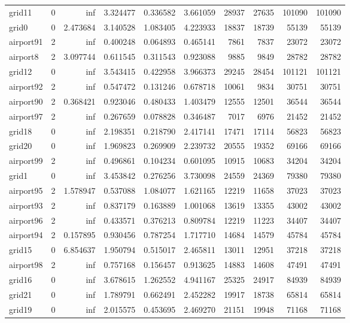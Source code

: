 \begin{longtable}{|l|r|r|r|r|r|r|r|r|r|}
grid11 & 0 & inf & 3.324477 & 0.336582 & 3.661059 & 28937 & 27635 & 101090 & 101090 \\
grid0 & 0 & 2.473684 & 3.140528 & 1.083405 & 4.223933 & 18837 & 18739 & 55139 & 55139 \\
airport91 & 2 & inf & 0.400248 & 0.064893 & 0.465141 & 7861 & 7837 & 23072 & 23072 \\
airport8 & 2 & 3.097744 & 0.611545 & 0.311543 & 0.923088 & 9885 & 9849 & 28782 & 28782 \\
grid12 & 0 & inf & 3.543415 & 0.422958 & 3.966373 & 29245 & 28454 & 101121 & 101121 \\
airport92 & 2 & inf & 0.547472 & 0.131246 & 0.678718 & 10061 & 9834 & 30751 & 30751 \\
airport90 & 2 & 0.368421 & 0.923046 & 0.480433 & 1.403479 & 12555 & 12501 & 36544 & 36544 \\
airport97 & 2 & inf & 0.267659 & 0.078828 & 0.346487 & 7017 & 6976 & 21452 & 21452 \\
grid18 & 0 & inf & 2.198351 & 0.218790 & 2.417141 & 17471 & 17114 & 56823 & 56823 \\
grid20 & 0 & inf & 1.969823 & 0.269909 & 2.239732 & 20555 & 19352 & 69166 & 69166 \\
airport99 & 2 & inf & 0.496861 & 0.104234 & 0.601095 & 10915 & 10683 & 34204 & 34204 \\
grid1 & 0 & inf & 3.453842 & 0.276256 & 3.730098 & 24559 & 24369 & 79380 & 79380 \\
airport95 & 2 & 1.578947 & 0.537088 & 1.084077 & 1.621165 & 12219 & 11658 & 37023 & 37023 \\
airport93 & 2 & inf & 0.837179 & 0.163889 & 1.001068 & 13619 & 13355 & 43002 & 43002 \\
airport96 & 2 & inf & 0.433571 & 0.376213 & 0.809784 & 12219 & 11223 & 34407 & 34407 \\
airport94 & 2 & 0.157895 & 0.930456 & 0.787254 & 1.717710 & 14684 & 14579 & 45784 & 45784 \\
grid15 & 0 & 6.854637 & 1.950794 & 0.515017 & 2.465811 & 13011 & 12951 & 37218 & 37218 \\
airport98 & 2 & inf & 0.757168 & 0.156457 & 0.913625 & 14883 & 14608 & 47491 & 47491 \\
grid16 & 0 & inf & 3.678615 & 1.262552 & 4.941167 & 25325 & 24917 & 84939 & 84939 \\
grid21 & 0 & inf & 1.789791 & 0.662491 & 2.452282 & 19917 & 18738 & 65814 & 65814 \\
grid19 & 0 & inf & 2.015575 & 0.453695 & 2.469270 & 21151 & 19948 & 71168 & 71168 \\

\end{longtable}
